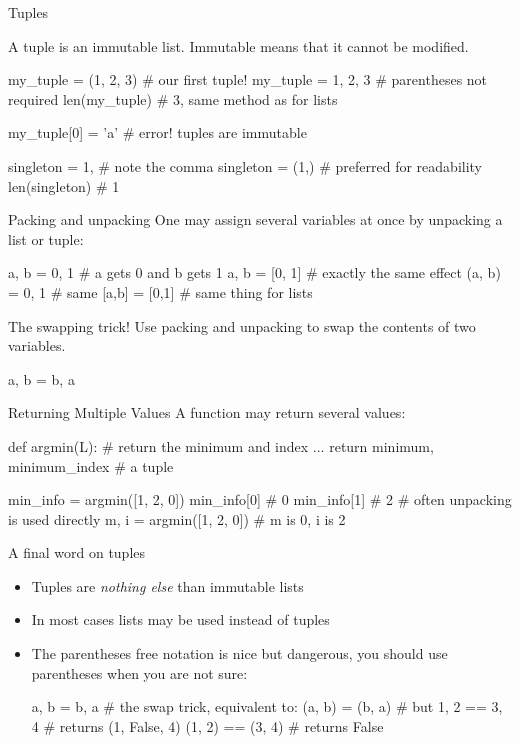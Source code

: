 \documentclass[hyperref={pdfpagelabels=false},table,handout]{beamer}
\begin{document}
\begin{frame}[fragile]{Tuples}
\begin{defblock}
A \alert{tuple} is an \alert{immutable} list. Immutable means that it cannot be modified.
\end{defblock}

\begin{example}
\begin{python}
my_tuple = (1, 2, 3) # our first tuple!
my_tuple = 1, 2, 3   # parentheses not required
len(my_tuple) # 3, same method as for lists

my_tuple[0] = 'a' # error! tuples are immutable

singleton = 1, # note the comma
singleton = (1,) # preferred for readability
len(singleton) # 1
\end{python}
\end{example}
\end{frame}

\begin{frame}[fragile]{Packing and unpacking}
One may assign several variables at once by \alert{unpacking} a list or tuple:
\begin{python}
a, b = 0, 1 # a gets 0 and b gets 1
a, b = [0, 1] # exactly the same effect
(a, b) = 0, 1 # same
[a,b] = [0,1] # same thing for lists
\end{python}
\pause
\begin{block}{The swapping trick!}
Use packing and unpacking to \alert{swap} the contents of two variables.
\begin{python}
a, b = b, a
\end{python}
\end{block}
\end{frame}


\begin{frame}[fragile]{Returning Multiple Values}
A function may return several values:
\begin{python}
def argmin(L): # return the minimum and index
  ...
  return minimum, minimum_index     # a tuple

min_info = argmin([1, 2, 0])
min_info[0] # 0
min_info[1] # 2
# often unpacking is used directly
m, i = argmin([1, 2, 0]) # m is 0, i is 2
\end{python}
\end{frame}

\begin{frame}[fragile]{A final word on tuples}
\begin{itemize}[<+->]
\item Tuples are \emph{nothing else} than immutable lists
\item In most cases lists may be used instead of tuples
\item The parentheses free notation is nice but \alert{dangerous},
you should \alert{use parentheses when you are not sure}:
\begin{python}
a, b = b, a # the swap trick, equivalent to:
(a, b) = (b, a)
# but
1, 2 == 3, 4 # returns (1, False, 4)
(1, 2) == (3, 4) # returns False
\end{python}
\end{itemize}
\end{frame}
\end{document}
